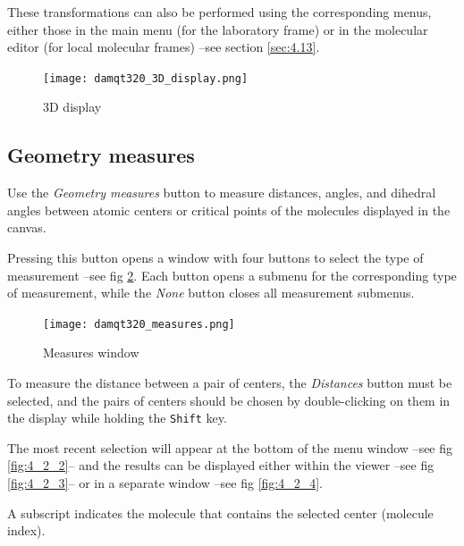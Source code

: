 \documentclass[10pt]{article}
\begin{document}
These transformations can also be performed using the corresponding menus,  
either those in the main menu (for the laboratory frame) or in the molecular editor  
(for local molecular frames) --see section \ref{sec:4.13}.  


\begin{figure}[H]
\begin{center}
\texttt{[image: damqt320\_3D\_display.png]}
\end{center}
\caption{{3D display}\label{fig:4_1_2}}
\end{figure}



\subsection{Geometry measures \label{sec:4.2}}

Use the {\it Geometry measures} button to measure distances, angles, and dihedral angles  
between atomic centers or critical points of the molecules displayed in the canvas.  

Pressing this button opens a window with four buttons to select the type of measurement --see fig \ref{fig:4_2_1}.  
Each button opens a submenu for the corresponding type of measurement, while the {\it None} button  
closes all measurement submenus.  

\begin{figure}[H]
\begin{center}
\texttt{[image: damqt320\_measures.png]}
\end{center}
\caption{{Measures window}\label{fig:4_2_1}}
\end{figure}

To measure the distance between a pair of centers, the {\it Distances}  
button must be selected, and the pairs of centers should be chosen by double-clicking on them  
in the display while holding the \texttt{Shift} key.  

The most recent selection will appear at the bottom of the menu window --see fig \ref{fig:4_2_2}--  
and the results can be displayed either within the viewer --see fig \ref{fig:4_2_3}--  
or in a separate window --see fig \ref{fig:4_2_4}.  

A subscript indicates the molecule that contains the selected center  
(molecule index).  


\vspace*{0.5cm}
\end{document}
